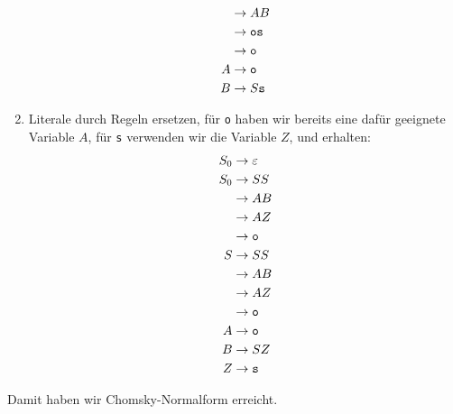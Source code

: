 \begin{loesung}
\begin{enumerate}
\begin{align*}
 &\rightarrow AB\\
 &\rightarrow {\tt o}{\tt s}\\
 &\rightarrow {\tt o}\\
A&\rightarrow {\tt o}\\
B&\rightarrow S{\tt s}
\end{align*}
\item Literale durch Regeln ersetzen, für {\tt o} haben wir bereits
eine dafür geeignete Variable  $A$, für {\tt s} verwenden wir die
Variable $Z$, und erhalten:
\begin{align*}
S_0&\rightarrow \varepsilon\\
S_0&\rightarrow SS\\
   &\rightarrow AB\\
   &\rightarrow AZ\\
   &\rightarrow {\tt o}\\
S&\rightarrow SS\\
 &\rightarrow AB\\
 &\rightarrow AZ\\
 &\rightarrow {\tt o}\\
A&\rightarrow {\tt o}\\
B&\rightarrow SZ\\
Z&\rightarrow {\tt s}
\end{align*}
\end{enumerate}
Damit haben wir Chomsky-Normalform erreicht.
\end{loesung}
